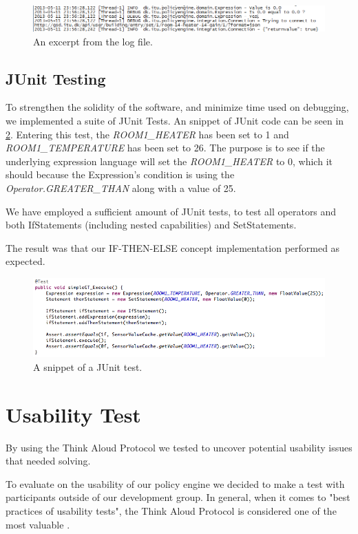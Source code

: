 \begin{figure}[ht]
\centering
\includegraphics[width=\columnwidth]{images/logoutput.png}
\caption{An excerpt from the log file.}
\label{fig:log}
\end{figure}

\subsection{JUnit Testing}
To strengthen the solidity of the software, and minimize time used on debugging, we implemented a suite of JUnit Tests. An snippet of JUnit code can be seen in \ref{fig:junit-example}. Entering this test, the \textit{ROOM1\_HEATER} has been set to 1 and \textit{ROOM1\_TEMPERATURE} has been set to 26. The purpose is to see if the underlying expression language will set the \textit{ROOM1\_HEATER} to 0, which it should because the Expression's condition is using the \textit{Operator.GREATER\_THAN} along with a value of 25.
 
We have employed a sufficient amount of JUnit tests, to test all operators and both IfStatements (including nested capabilities) and SetStatements.

The result was that our IF-THEN-ELSE concept implementation performed as expected.

\begin{figure}[ht]
\centering
\includegraphics[scale=.5]{images/appendix-junit-example.png}
\caption{A snippet of a JUnit test.}
\label{fig:junit-example}
\end{figure}

\section{Usability Test}\label{sec:usability-test}
By using the Think Aloud Protocol we tested to uncover potential usability issues that needed solving.

To evaluate on the usability of our policy engine we decided to make a test with participants outside of our development group. In general, when it comes to "best practices of usability tests", the Think Aloud Protocol is considered one of the most valuable \cite{Nielsen1993}.

